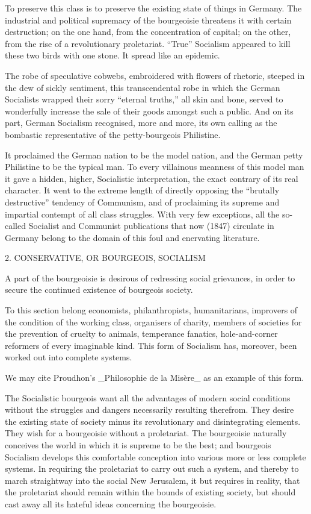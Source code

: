 To preserve this class is to preserve the existing state of things in
Germany. The industrial and political supremacy of the bourgeoisie
threatens it with certain destruction; on the one hand, from the
concentration of capital; on the other, from the rise of a
revolutionary proletariat. “True” Socialism appeared to kill these two
birds with one stone. It spread like an epidemic.

The robe of speculative cobwebs, embroidered with flowers of rhetoric,
steeped in the dew of sickly sentiment, this transcendental robe in
which the German Socialists wrapped their sorry “eternal truths,” all
skin and bone, served to wonderfully increase the sale of their goods
amongst such a public. And on its part, German Socialism recognised,
more and more, its own calling as the bombastic representative of the
petty-bourgeois Philistine.

It proclaimed the German nation to be the model nation, and the German
petty Philistine to be the typical man. To every villainous meanness of
this model man it gave a hidden, higher, Socialistic interpretation,
the exact contrary of its real character. It went to the extreme length
of directly opposing the “brutally destructive” tendency of Communism,
and of proclaiming its supreme and impartial contempt of all class
struggles. With very few exceptions, all the so-called Socialist and
Communist publications that now (1847) circulate in Germany belong to
the domain of this foul and enervating literature.

2. CONSERVATIVE, OR BOURGEOIS, SOCIALISM

A part of the bourgeoisie is desirous of redressing social grievances,
in order to secure the continued existence of bourgeois society.

To this section belong economists, philanthropists, humanitarians,
improvers of the condition of the working class, organisers of charity,
members of societies for the prevention of cruelty to animals,
temperance fanatics, hole-and-corner reformers of every imaginable
kind. This form of Socialism has, moreover, been worked out into
complete systems.

We may cite Proudhon’s _Philosophie de la Misère_ as an example of this
form.

The Socialistic bourgeois want all the advantages of modern social
conditions without the struggles and dangers necessarily resulting
therefrom. They desire the existing state of society minus its
revolutionary and disintegrating elements. They wish for a bourgeoisie
without a proletariat. The bourgeoisie naturally conceives the world in
which it is supreme to be the best; and bourgeois Socialism develops
this comfortable conception into various more or less complete systems.
In requiring the proletariat to carry out such a system, and thereby to
march straightway into the social New Jerusalem, it but requires in
reality, that the proletariat should remain within the bounds of
existing society, but should cast away all its hateful ideas concerning
the bourgeoisie.


